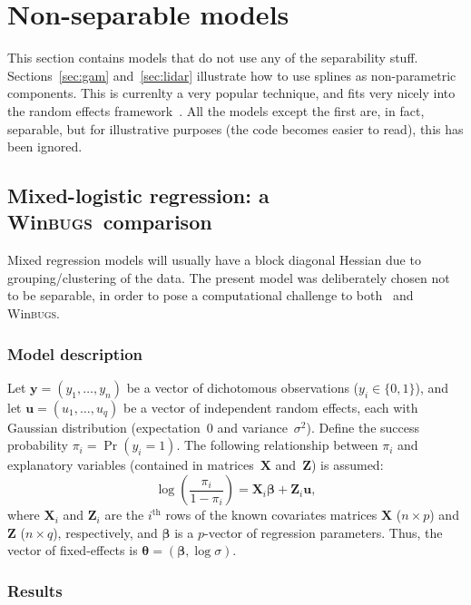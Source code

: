 \documentclass{admbmanual}
\newcommand{\scWinBUGS}{Win\textsc{bugs}}
\begin{document}
\section{Non-separable models}

This section contains models that do not use any of the separability stuff.
Sections~\ref{sec:gam} and~\ref{sec:lidar} illustrate how to use splines as
non-parametric components. This is currenlty a very popular technique, and fits
very nicely into the random effects framework~\cite{rupp:wand:carr:2003}. All
the models except the first are, in fact, separable, but for illustrative
purposes (the code becomes easier to read), this has been ignored.

\subsection{Mixed-logistic regression: a \scWinBUGS\ comparison}
\label{sec:logistic_example}

Mixed regression models will usually have a block diagonal Hessian due to
grouping/clustering of the data. The present model was deliberately chosen not
to be separable, in order to pose a computational challenge to both \scAR\ and
\scWinBUGS.

\subsubsection{Model description}

Let $\mathbf{y}=(y_1,\ldots,y_n)$ be a vector of dichotomous observations
($y_i\in\{0,1\}$), and let $\mathbf{u}=(u_1,\ldots,u_q)$ be a vector of
independent random effects, each with Gaussian distribution (expectation~$0$ and
variance~$\sigma^2$). Define the success probability $\pi_i=\Pr(y_i=1)$. The
following relationship between $\pi_i$ and explanatory variables (contained in
matrices~$\mathbf{X}$ and~$\mathbf{Z}$) is assumed:
\[
  \log\left(\frac{\pi_i}{1-\pi_i}\right) = \mathbf{X}_i\mathbf{\beta} +
  \mathbf{Z}_i\mathbf{u},
\]
where $\mathbf{X}_i$ and $\mathbf{Z}_i$ are the $i^\textrm{th}$ rows of the
known covariates matrices $\mathbf{X}$ ($n\times p$) and $\mathbf{Z}$ ($n\times
q$), respectively, and $\mathbf{\beta}$ is a $p$-vector of regression
parameters. Thus, the vector of fixed-effects is
$\mathbf{\theta}=(\mathbf{\beta},\log\sigma)$.

\subsubsection{Results}
\end{document}
